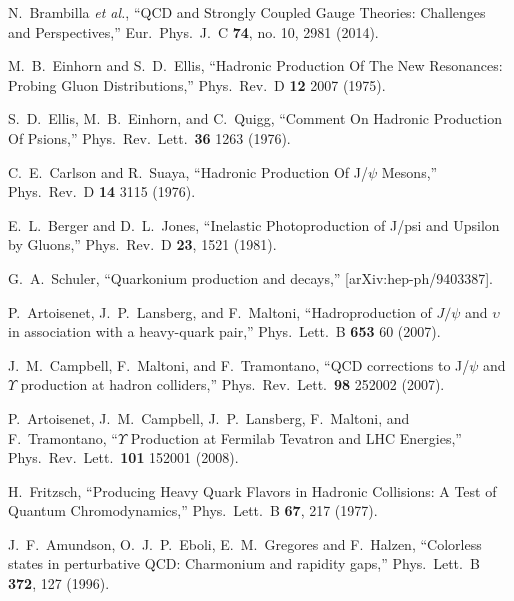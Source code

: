 \documentclass[12pt,a4paper,final]{iopart}
\begin{document}
\begin{thebibliography}{100}
  N.~Brambilla {\it et al.},
  ``QCD and Strongly Coupled Gauge Theories: Challenges and Perspectives,''
  Eur.\ Phys.\ J.\ C {\bf 74}, no. 10, 2981 (2014).



  M.~B.~Einhorn and S.~D.~Ellis,
  ``Hadronic Production Of The New Resonances: Probing Gluon Distributions,''
  Phys.\ Rev.\  D {\bf 12} 2007 (1975).

  S.~D.~Ellis, M.~B.~Einhorn, and C.~Quigg,
  ``Comment On Hadronic Production Of Psions,''
  Phys.\ Rev.\ Lett.\  {\bf 36} 1263 (1976).

  C.~E.~Carlson and R.~Suaya,
  ``Hadronic Production Of J/$\psi$ Mesons,''
  Phys.\ Rev.\  D {\bf 14} 3115 (1976).
  
  E.~L.~Berger and D.~L.~Jones,
  ``Inelastic Photoproduction of J/psi and Upsilon by Gluons,''
  Phys.\ Rev.\ D {\bf 23}, 1521 (1981).

  G.~A.~Schuler,        
  ``Quarkonium production and decays,''
  [arXiv:hep-ph/9403387].


  P.~Artoisenet, J.~P.~Lansberg, and F.~Maltoni,
  ``Hadroproduction of $J/\psi$ and $\upsilon$ in association with a
  heavy-quark pair,''
  Phys.\ Lett.\  B {\bf 653} 60 (2007).


  J.~M.~Campbell, F.~Maltoni, and F.~Tramontano,
  ``QCD corrections to J/$\psi$ and $\Upsilon$ production at hadron colliders,''
  Phys.\ Rev.\ Lett.\  {\bf 98} 252002 (2007).


  P.~Artoisenet, J.~M.~Campbell, J.~P.~Lansberg, F.~Maltoni, and F.~Tramontano,
  ``$\Upsilon$ Production at Fermilab Tevatron and LHC Energies,''
  Phys.\ Rev.\ Lett.\  {\bf 101} 152001 (2008).
  

  H.~Fritzsch,
  ``Producing Heavy Quark Flavors in Hadronic Collisions: A Test of Quantum Chromodynamics,''
  Phys.\ Lett.\ B {\bf 67}, 217 (1977).
  
  J.~F.~Amundson, O.~J.~P.~Eboli, E.~M.~Gregores and F.~Halzen,
  ``Colorless states in perturbative QCD: Charmonium and rapidity gaps,''
  Phys.\ Lett.\ B {\bf 372}, 127 (1996).



\end{thebibliography}
\end{document}
